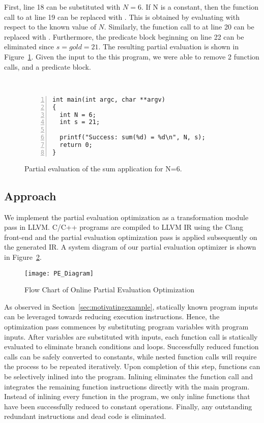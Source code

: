 First, line 18 can be substituted with $N = 6$.
If N is a constant, then the function call to  at line 19 can be replaced with .
This is obtained by evaluating  with respect to the known value of $N$. 
Similarly, the function call to  at line 20 can be replaced with .
Furthermore, the predicate block beginning on line 22 can be eliminated since $s = gold = 21$.
The resulting partial evaluation is shown in Figure~\ref{fig:pe_sum}.
Given the input to the this program, we were able to remove 2 function calls, and a predicate block.

\begin{figure}[htbp]\
\begin{Verbatim}[frame=single,fontsize={\scriptsize},numbers=left,numbersep=5pt,xleftmargin=10pt]
int main(int argc, char **argv)
{
  int N = 6;
  int s = 21;

  printf("Success: sum(%d) = %d\n", N, s);
  return 0;
}
\end{Verbatim}
\caption{Partial evaluation of the sum application for N=6.}
\label{fig:pe_sum}
\end{figure}

\subsection{Approach}

We implement the partial evaluation optimization as a transformation module pass in LLVM.
C/C++ programs are compiled to LLVM IR using the Clang front-end and the partial evaluation optimization pass is applied subsequently on the generated IR.
A system diagram of our partial evaluation optimizer is shown in Figure~\ref{fig:pe_diagram}.

\begin{figure}[htbp]
  \centering
  \texttt{[image: PE\_Diagram]}
  \caption{Flow Chart of Online Partial Evaluation Optimization}
  \label{fig:pe_diagram}
\end{figure}

As observed in Section~\ref{sec:motivatingexample}, statically known program inputs can be leveraged towards reducing execution instructions. 
Hence, the optimization pass commences by substituting program variables with program inputs.
After variables are substituted with inputs, each function call is statically evaluated to eliminate branch conditions and loops.
Successfully reduced function calls can be safely converted to constants, while nested function calls will require the process to be repeated iteratively. 
Upon completion of this step, functions can be selectively inlined into the program.
Inlining eliminates the function call and integrates the remaining function instructions directly with the main program.
Instead of inlining every function in the program, we only inline functions that have been successfully reduced to constant operations.
Finally, any outstanding redundant instructions and dead code is eliminated.

